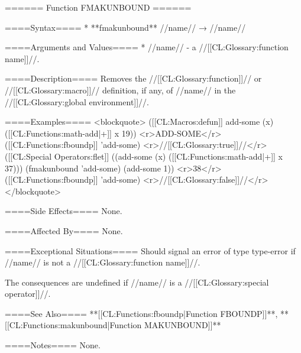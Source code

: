 ====== Function FMAKUNBOUND ======

====Syntax====
  * **fmakunbound** //name// → //name//

====Arguments and Values====
  * //name// - a //[[CL:Glossary:function name]]//.

====Description====
Removes the //[[CL:Glossary:function]]// or //[[CL:Glossary:macro]]// definition, if any, of //name// in the //[[CL:Glossary:global environment]]//.

====Examples====
<blockquote>
([[CL:Macros:defun]] add-some (x)
  ([[CL:Functions:math-add|+]] x 19)) 
<r>ADD-SOME</r>
([[CL:Functions:fboundp]] 'add-some) <r>//[[CL:Glossary:true]]//</r>
([[CL:Special Operators:flet]] ((add-some (x) ([[CL:Functions:math-add|+]] x 37)))
  (fmakunbound 'add-some)
  (add-some 1)) <r>38</r>
([[CL:Functions:fboundp]] 'add-some) <r>//[[CL:Glossary:false]]//</r>
</blockquote>

====Side Effects====
None.

====Affected By====
None.

====Exceptional Situations====
Should signal an error of type type-error if //name// is not a //[[CL:Glossary:function name]]//.

The consequences are undefined if //name// is a //[[CL:Glossary:special operator]]//.

====See Also====
**[[CL:Functions:fboundp|Function FBOUNDP]]**, **[[CL:Functions:makunbound|Function MAKUNBOUND]]**

====Notes====
None.

